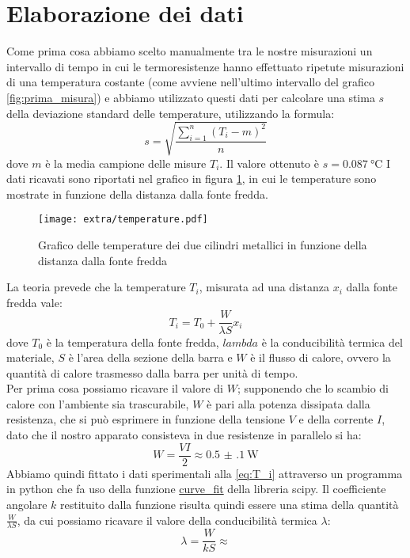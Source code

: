 \documentclass{article}
\begin{document}
    \section{Elaborazione dei dati}
    Come prima cosa abbiamo scelto manualmente tra le nostre misurazioni un intervallo
    di tempo in cui le termoresistenze hanno effettuato ripetute misurazioni di una
    temperatura costante (come avviene nell'ultimo intervallo del grafico
    \ref{fig:prima_misura}) e abbiamo utilizzato questi dati per calcolare una stima $s$
    della deviazione standard  delle temperature, utilizzando la formula:
    \begin{equation}
        s=\sqrt{\frac{\sum_{i=1}^{n} \left( T_i-m \right) ^2}{n}} 
    \end{equation}
    dove $m$ è la media campione delle misure  $T_i$. Il valore ottenuto è $s=\SI{0.087}{\celsius}$
    I dati ricavati sono riportati nel grafico in figura \ref{fig:temperature}, in cui le temperature sono
    mostrate in funzione della distanza dalla fonte fredda.\\
    \begin{figure}[t]
        \centering
        \texttt{[image: extra/temperature.pdf]}
        \caption{Grafico delle temperature dei due cilindri metallici in funzione della
        distanza dalla fonte fredda}
        \label{fig:temperature}
    \end{figure}
    La teoria prevede che la temperature $T_i$, misurata ad una distanza $x_i$ dalla
    fonte fredda vale:
    \begin{equation}
        \label{eq:T_i}
        T_i=T_0+\frac{W}{ \lambda S}x_i
    \end{equation}
    dove $T_0$ è la temperatura della fonte fredda, 
    $lambda$ è la conducibilità termica del materiale,
    $S$ è l'area della sezione della barra e 
    $W$ è il flusso di calore, ovvero la quantità di calore trasmesso dalla barra per 
    unità di tempo.\\
    Per prima cosa possiamo ricavare il valore di $W$; supponendo che lo scambio di calore
    con l'ambiente sia trascurabile, $W$ è pari alla potenza dissipata dalla resistenza,
    che si può esprimere in funzione della tensione $V$ e della corrente $I$,
    dato che il nostro apparato consisteva in due resistenze in parallelo si ha:
    \begin{equation}
        W=\frac{VI}{2}\approx\SI{0.5(1)}{\watt}
    \end{equation}
    Abbiamo quindi fittato i dati sperimentali alla \ref{eq:T_i} attraverso un programma
    in python che fa uso della funzione 
    \href{https://docs.scipy.org/doc/scipy/reference/generated/scipy.optimize.curve_fit.html}{curve\_fit}
    della libreria scipy. 
    Il coefficiente angolare $k$ restituito dalla funzione risulta quindi essere una
    stima della quantità $\frac{W}{ \lambda S}$, da cui possiamo ricavare il valore
    della conducibilità termica $\lambda$:
     \begin{equation}
        \lambda= \frac{W}{kS}\approx
    \end{equation}
\end{document}
